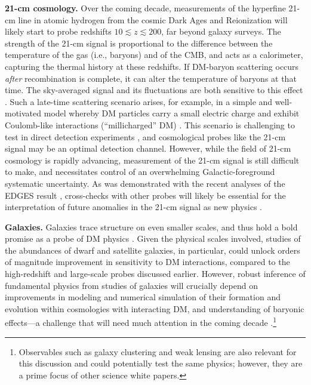 \documentclass[12pt]{article}
\begin{document}
\textbf{21-cm cosmology.} 
Over the coming decade, measurements of the hyperfine 21-cm line in atomic hydrogen from the cosmic Dark Ages and Reionization will likely start to probe redshifts $10 \lesssim z \lesssim 200$, far beyond galaxy surveys.
The strength of the 21-cm signal is proportional to the difference between the temperature of the gas (i.e., baryons) and of the CMB, and acts as a calorimeter, capturing the thermal history at these redshifts.
If DM-baryon scattering occurs \textit{after} recombination is complete, it can alter the temperature of baryons at that time. 
The sky-averaged signal and its fluctuations are both sensitive to this effect \cite{Munoz_15, Barkana_18, Fialkov_18, Munoz_18,2018arXiv180210094M}.
Such a late-time scattering scenario arises, for example, in a simple and well-motivated model whereby DM particles carry a small electric charge and exhibit Coulomb-like interactions (``millicharged'' DM) \cite{2017arXiv170704591B,2019arXiv190208623D}.
This scenario is challenging to test in direct detection experiments \cite{2011PhRvD..83f3509M}, and cosmological probes like the 21-cm signal may be an optimal detection channel.
However, while the field of 21-cm cosmology is rapidly advancing, measurement of the 21-cm signal is still difficult to make, and necessitates control of an overwhelming Galactic-foreground systematic uncertainty. 
As was demonstrated with the recent analyses of the EDGES result \cite{Bowman_18}, cross-checks with other probes will likely be essential for the interpretation of future anomalies in the 21-cm signal as new physics \cite{Barkana:2018lgd,Kovetz:2018zan,Berlin:2018sjs}. 

\textbf{Galaxies.}
Galaxies trace structure on even smaller scales, and thus hold a bold promise as a probe of DM physics \cite{2019arXiv190201055D}.
Given the physical scales involved, studies of the abundances of dwarf and satellite galaxies, in particular, could unlock orders of magnitude improvement in sensitivity to DM interactions, compared to the high-redshift and large-scale probes discussed earlier.
However, robust inference of fundamental physics from studies of galaxies will crucially depend on improvements in modeling and numerical simulation of their formation and evolution within cosmologies with interacting DM, and understanding of baryonic effects---a challenge that will need much attention in the coming decade \cite{2019arXiv190201055D}.\footnote{Observables such as galaxy clustering and weak lensing are also relevant for this discussion and could potentially test the same physics; however, they are a prime focus of other science white papers.}
\end{document}
